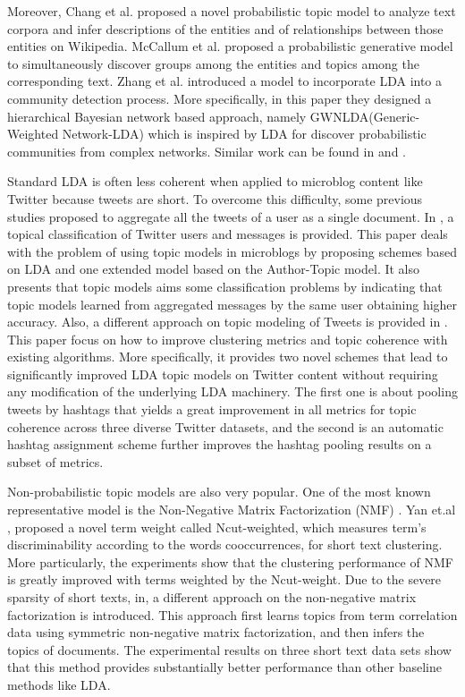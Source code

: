 Moreover, Chang et al. \cite{chang} proposed a novel probabilistic topic model to analyze text corpora and 
infer descriptions of the entities and of relationships between those entities on Wikipedia. McCallum 
et al. \cite{McCallum} proposed a probabilistic generative model to simultaneously discover groups 
among the entities and topics among the corresponding text. Zhang et al. \cite{Zhang} introduced a model 
to incorporate LDA into a community detection process. More specifically, in this paper they designed a 
hierarchical Bayesian network based approach, namely GWNLDA(Generic-Weighted Network-LDA) which is inspired 
by LDA for discover probabilistic communities from complex networks. Similar work can be found in \cite{Liu} 
and \cite{Nallapati}.

Standard LDA is often less coherent when applied to microblog content like Twitter because tweets are short. 
To overcome this difficulty, some previous studies proposed to aggregate all the tweets of a user as a single
document. In \cite{Hong}, a topical classification of Twitter users and messages is provided. This paper 
deals with the problem of using topic models in microblogs by proposing schemes based on LDA 
and one extended model based on the Author-Topic model. It also presents that topic models aims 
some classification problems by indicating that topic models learned from aggregated messages
by the same user obtaining higher accuracy. Also, a different approach on topic modeling of Tweets is provided
in \cite{improving}. This paper focus on how to improve clustering metrics and topic coherence with existing algorithms. More specifically, it provides two novel schemes that lead to significantly improved LDA topic models on Twitter content without requiring any modification of the underlying LDA machinery. The first one is about pooling tweets by hashtags that yields a great improvement in all metrics for topic coherence across three diverse Twitter datasets, and the second is an automatic hashtag assignment scheme further improves the hashtag pooling results on a subset of metrics.


Non-probabilistic topic models are also very popular. One of the most known representative model is the Non-Negative Matrix Factorization (NMF) \cite{paa94,lee99}. Yan et.al \cite{Yan},  proposed a novel term weight called Ncut-weighted, which measures term’s discriminability according to the words cooccurrences, for short text clustering. More particularly, the experiments show that the clustering performance of NMF is greatly improved with terms weighted by the Ncut-weight. Due to the severe sparsity of short texts, in\cite{yan2013learning}, a different approach on the non-negative matrix factorization is introduced. This approach first learns topics from term correlation data using symmetric non-negative matrix factorization, and then infers the topics of documents. The experimental results on three short text data sets show that this method provides substantially better performance than other baseline methods like LDA.



